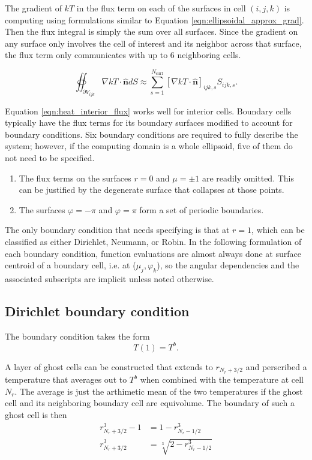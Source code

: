 The gradient of $kT$ in the flux term on each of the surfaces in cell $(i,j,k)$ is computing using formulations similar to Equation \ref{eqn:ellipsoidal_approx_grad}. Then the flux integral is simply the sum over all
surfaces. Since the gradient on any surface only involves the cell of interest and its neighbor across that surface, the flux term only communicates with up to 6 neighboring cells.

\begin{equation}
    \oiint_{\partial V_{ijk}} \nabla kT \cdot \mathbf{\hat{n}} dS \approx \sum_{s=1}^{N_{\text{surf}}} \left[ \nabla kT \cdot \mathbf{\hat{n}} \right]_{ijk,s}  S_{ijk,s}.
    \label{eqn:heat_interior_flux}
\end{equation}

Equation \ref{eqn:heat_interior_flux} works well for interior cells. Boundary cells typically have the flux terms for its boundary surfaces modified to account for boundary conditions. Six boundary conditions are
required to fully describe the system; however, if the computing domain is a whole ellipsoid, five of them do not need to be specified.
\begin{enumerate}
    \item The flux terms on the surfaces $r = 0$ and $\mu = \pm 1$ are readily omitted. This can be justified by the degenerate surface that collapses at those points.
    \item The surfaces $\varphi = -\pi$ and $\varphi = \pi$ form a set of periodic boundaries. 
\end{enumerate}

The only boundary condition that needs specifying is that at $r = 1$, which can be classified as either Dirichlet, Neumann, or Robin. In the following formulation of each boundary condition, function evaluations are
almost always done at surface centroid of a boundary cell, i.e. at ($\mu_j, \varphi_k$), so the angular dependencies and the associated subscripts are implicit unless noted otherwise.

\subsection{Dirichlet boundary condition} 
The boundary condition takes the form
\begin{equation}
    T(1) = T^b.
\end{equation}

A layer of ghost cells can be constructed that extends to $r_{N_r + 3/2}$ and perscribed a temperature that averages out to $T^b$ when combined with the temperature at cell $N_r$. The average is just the arthimetic
mean of the two temperatures if the ghost cell and its neighboring boundary cell are equivolume. The boundary of such a ghost cell is then
\begin{subequations}
    \begin{align}
        r_{N_r + 3/2}^3 - 1 &= 1 - r_{N_r - 1/2}^3 \\
        r_{N_r + 3/2}^3 &= \sqrt[3]{2 - r_{N_r - 1/2}^3} 
    \end{align}
\end{subequations}

